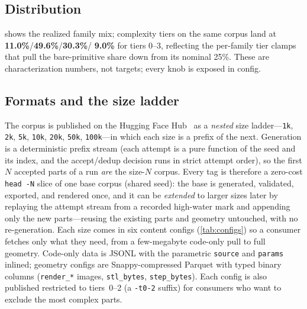 \documentclass[11pt]{article}
\newcommand{\code}[1]{\texttt{#1}}
\begin{document}
\subsection{Distribution}
 shows the realized family mix; complexity
tiers on the same corpus land at \textbf{11.0\%}/\textbf{49.6\%}/\textbf{30.3\%}/%
\textbf{9.0\%} for tiers 0--3, reflecting the per-family tier clamps that pull the
bare-primitive share down from its nominal 25\%. These are characterization
numbers, not targets; every knob is exposed in config.

\subsection{Formats and the size ladder}
The corpus is published on the Hugging Face Hub~\cite{huggingfacedatasets} as a
\emph{nested} size ladder---\code{1k}, \code{2k}, \code{5k}, \code{10k},
\code{20k}, \code{50k}, \code{100k}---in which each size is a prefix of the next.
Generation is a deterministic prefix stream (each attempt is a pure function of
the seed and its index, and the accept/dedup decision runs in strict attempt
order), so the first $N$ accepted parts of a run \emph{are} the size-$N$ corpus.
Every tag is therefore a zero-cost \code{head -N} slice of one base corpus
(shared seed): the base is generated, validated, exported, and rendered once,
and it can be \emph{extended} to larger sizes later by replaying the attempt
stream from a recorded high-water mark and appending only the new parts---reusing
the existing parts and geometry untouched, with no re-generation.
Each size comes in six content configs (\cref{tab:configs}) so a consumer fetches
only what they need, from a few-megabyte code-only pull to full geometry.
Code-only data is JSONL with the parametric \code{source} and \code{params}
inlined; geometry configs are Snappy-compressed Parquet with typed binary columns
(\code{render\_*} images, \code{stl\_bytes}, \code{step\_bytes}). Each config is
also published restricted to tiers~0--2 (a \code{-t0-2} suffix) for consumers who
want to exclude the most complex parts.
\end{document}
